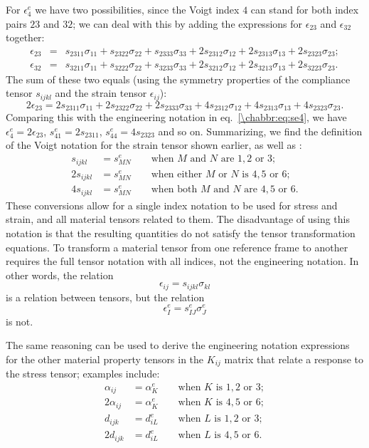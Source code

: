 For $\epsilon^e_4$ we have two possibilities, since the Voigt index $4$ can stand for both index pairs $23$ and $32$;  we can deal with this by adding the expressions for $\epsilon_{23}$ and $\epsilon_{32}$ together:
\begin{eqnarray}
	\epsilon_{23} &=& s_{2311}\sigma_{11} + s_{2322}\sigma_{22} + s_{2333}\sigma_{33} + 2 s_{2312}\sigma_{12} +2 s_{2313}\sigma_{13} +2 s_{2323}\sigma_{23};\\
	\epsilon_{32} &=& s_{3211}\sigma_{11} + s_{3222}\sigma_{22} + s_{3233}\sigma_{33} + 2 s_{3212}\sigma_{12} +2 s_{3213}\sigma_{13} +2 s_{3223}\sigma_{23}.
\end{eqnarray}
The sum of these two equals (using the symmetry properties of the compliance tensor $s_{ijkl}$ and the strain tensor $\epsilon_{ij}$):
\[
	2\epsilon_{23} = 2s_{2311}\sigma_{11}+2s_{2322}\sigma_{22} + 2s_{2333}\sigma_{33} + 4 s_{2312}\sigma_{12} +4 s_{2313}\sigma_{13} +4 s_{2323}\sigma_{23}.
\]
Comparing this with the engineering notation in eq.~\ref{\chabbr:eq:se4}, we have $\epsilon_4^e=2\epsilon_{23}$, $s^e_{41}=2s_{2311}$, $s^e_{44}=4s_{2323}$ and so on.  Summarizing, we find the definition of the Voigt notation for the strain tensor shown earlier, as well as :
\begin{subequations}\begin{align}
	s_{ijkl} &= s^e_{MN} \qquad\mbox{when $M$ and $N$ are $1,2$ or $3$};\\
	2s_{ijkl} &= s^e_{MN} \qquad\mbox{when either $M$ or $N$ is $4,5$ or $6$};\\
	4s_{ijkl} &= s^e_{MN} \qquad\mbox{when both $M$ and $N$ are $4,5$ or $6$}.
\end{align}\end{subequations}
These conversions allow for a single index notation to be used for stress and strain, and all material tensors related to them.  The disadvantage of using this notation is that the resulting quantities do not satisfy the tensor transformation equations.  To transform a material tensor from one reference frame to another requires the full tensor notation with all indices, not the engineering notation.  In other words, the relation
\[
	\epsilon_{ij} = s_{ijkl}\sigma_{kl}
\]
is a relation between tensors, but the relation
\[
	\epsilon^e_{I} = s^e_{IJ}\sigma^e_J
\]
is not.

The same reasoning can be used to derive the engineering notation expressions for the other material property tensors in the $K_{ij}$ matrix that relate a response to the stress tensor; examples include:
\begin{subequations}\begin{align}
	\alpha_{ij} &= \alpha^e_K \qquad\mbox{when $K$ is $1,2$ or $3$};\\
	2\alpha_{ij} &= \alpha^e_K \qquad\mbox{when $K$ is $4,5$ or $6$};\\
	d_{ijk} &= d^e_{iL} \qquad\mbox{when $L$ is $1,2$ or $3$};\\
	2d_{ijk} &= d^e_{iL}\qquad\mbox{when $L$ is $4,5$ or $6$}.
\end{align}\end{subequations}

